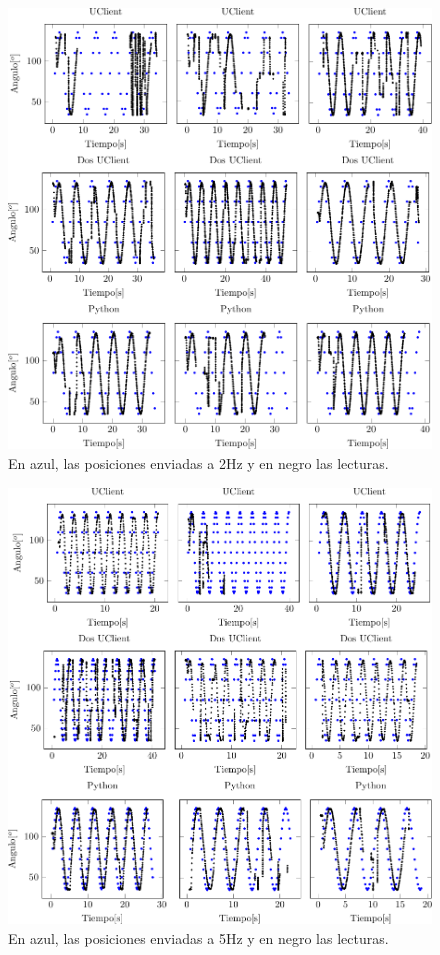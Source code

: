 \documentclass[12pt,a4paper,final,twoside]{book}
\begin{document}
\begin{figure}[H]
	\centering
    \includegraphics[scale=1]{plots/h2.pdf}
	 \caption{En azul, las posiciones enviadas a 2Hz y en negro las lecturas.}
  \label{fig:sin2H}
\end{figure}
\begin{figure}[H]
	\centering
   \includegraphics[scale=1]{plots/h5.pdf}
	 \caption{En azul, las posiciones enviadas a 5Hz y en negro las lecturas. }
  \label{fig:sin5H}
\end{figure}
\end{document}

